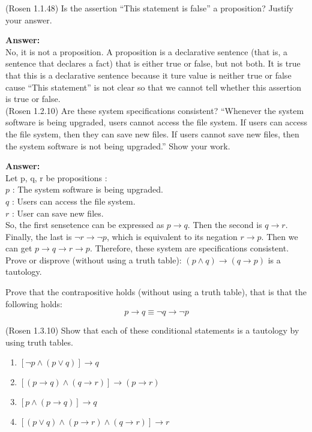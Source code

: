 \documentclass[10pt]{exam}
\begin{document}
\begin{questions}
\question[3] (Rosen 1.1.48) Is the assertion ``This statement is false'' a proposition? Justify your answer.

\textbf {Answer:}
\\
No, it is not a proposition. A proposition is a declarative sentence (that is, a sentence that declares a fact) that is either true or false, but not both. It is true that this is a declarative sentence because it ture value is neither true or false cause ``This statement'' is not clear so that we cannot tell whether this assertion is true or false.\\


\question[5] (Rosen 1.2.10) Are these system specifications consistent? ``Whenever the system software is being upgraded, users cannot access the file system. If users can access the file system, then they can save new files. If users cannot save new files, then the system software is not being upgraded.'' 
\newline Show your work.

\textbf {Answer:}\\
Let p, q, r be propositions :\\
$p$ : The system software is being upgraded.\\
$q$ : Users can access the file system.\\
$r$ : User can save new files.\\
So, the first sensetence can be expressed as $p \rightarrow q$. Then the second is $ q \rightarrow r$. Finally, the last is $\neg r \rightarrow \neg p$, which is equivalent to its negation $ r \rightarrow p$. Then we can get $ p \rightarrow q \rightarrow r \rightarrow p$. Therefore, these system are specifications consistent.\\


\question[3] Prove or disprove (without using a truth table): $(p \wedge q) \rightarrow (q \rightarrow p)$ is a tautology.

\question[3] Prove that the contrapositive holds (without using a truth table), that is that the following holds:
$$p \rightarrow q \equiv \neg q \rightarrow \neg p$$


\question[8] (Rosen 1.3.10) Show that each of these conditional statements is a tautology by using truth tables.
\begin{enumerate} [label=(\alph*)]
  \item $\left[\neg p \land (p \lor q) \right] \rightarrow q$
  \item $\left[(p \rightarrow q) \land (q \rightarrow r) \right] \rightarrow (p \rightarrow r)$
  \item $\left[p \land (p \rightarrow q) \right] \rightarrow q$
  \item $\left[(p \lor q) \land (p \rightarrow r) \land (q \rightarrow r) \right] \rightarrow r$
\end{enumerate}


\end{questions}
\end{document}
